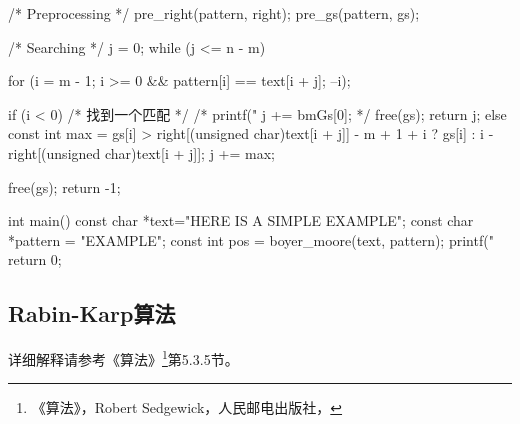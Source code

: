 \begin{Codex}[label=boyer_moore.c]
{    /* Preprocessing */
    pre_right(pattern, right);
    pre_gs(pattern, gs);

    /* Searching */
    j = 0;
    while (j <= n - m) {
        for (i = m - 1; i >= 0 && pattern[i] == text[i + j]; --i);

        if (i < 0) { /* 找到一个匹配 */
            /* printf("%
            j += bmGs[0]; */
            free(gs);
            return j;
        } else {
            const int max = gs[i] > right[(unsigned char)text[i + j]] -
                    m + 1 + i ? gs[i] : i - right[(unsigned char)text[i + j]];
            j += max;
        }
    }
    free(gs);
    return -1;
}


int main() {
    const char *text="HERE IS A SIMPLE EXAMPLE";
    const char *pattern = "EXAMPLE";
    const int pos = boyer_moore(text, pattern);
    printf("%
    return 0;
}
\end{Codex}


\subsection{Rabin-Karp算法}
详细解释请参考《算法》\footnote{《算法》，Robert 
Sedgewick，人民邮电出版社，}第5.3.5节。

